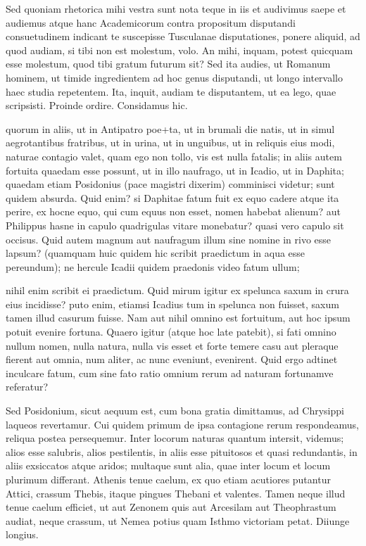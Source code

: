  Sed quoniam rhetorica mihi vestra sunt nota teque in iis et audivimus saepe et audiemus atque hanc Academicorum contra propositum disputandi consuetudinem indicant te suscepisse Tusculanae disputationes, ponere aliquid, ad quod audiam, si tibi non est molestum, volo. An mihi, inquam, potest quicquam esse molestum, quod tibi gratum futurum sit? Sed ita audies, ut Romanum hominem, ut timide ingredientem ad hoc genus disputandi, ut longo intervallo haec studia repetentem. Ita, inquit, audiam te disputantem, ut ea lego, quae scripsisti. Proinde ordire. Considamus hic.

 quorum in aliis, ut in Antipatro poe+ta, ut in brumali die natis, ut in simul aegrotantibus fratribus, ut in urina, ut in unguibus, ut in reliquis eius modi, naturae contagio valet, quam ego non tollo, vis est nulla fatalis; in aliis autem fortuita quaedam esse possunt, ut in illo naufrago, ut in Icadio, ut in Daphita; quaedam etiam Posidonius (pace magistri dixerim) comminisci videtur; sunt quidem absurda. Quid enim? si Daphitae fatum fuit ex equo cadere atque ita perire, ex hocne equo, qui cum equus non esset, nomen habebat alienum? aut Philippus hasne in capulo quadrigulas vitare monebatur? quasi vero capulo sit occisus. Quid autem magnum aut naufragum illum sine nomine in rivo esse lapsum? (quamquam huic quidem hic scribit praedictum in aqua esse pereundum); ne hercule Icadii quidem praedonis video fatum ullum;

 nihil enim scribit ei praedictum. Quid mirum igitur ex spelunca saxum in crura eius incidisse? puto enim, etiamsi Icadius tum in spelunca non fuisset, saxum tamen illud casurum fuisse. Nam aut nihil omnino est fortuitum, aut hoc ipsum potuit evenire fortuna. Quaero igitur (atque hoc late patebit), si fati omnino nullum nomen, nulla natura, nulla vis esset et forte temere casu aut pleraque fierent aut omnia, num aliter, ac nunc eveniunt, evenirent. Quid ergo adtinet inculcare fatum, cum sine fato ratio omnium rerum ad naturam fortunamve referatur?

 Sed Posidonium, sicut aequum est, cum bona gratia dimittamus, ad Chrysippi laqueos revertamur. Cui quidem primum de ipsa contagione rerum respondeamus, reliqua postea persequemur. Inter locorum naturas quantum intersit, videmus; alios esse salubris, alios pestilentis, in aliis esse pituitosos et quasi redundantis, in aliis exsiccatos atque aridos; multaque sunt alia, quae inter locum et locum plurimum differant. Athenis tenue caelum, ex quo etiam acutiores putantur Attici, crassum Thebis, itaque pingues Thebani et valentes. Tamen neque illud tenue caelum efficiet, ut aut Zenonem quis aut Arcesilam aut Theophrastum audiat, neque crassum, ut Nemea potius quam Isthmo victoriam petat. Diiunge longius.

